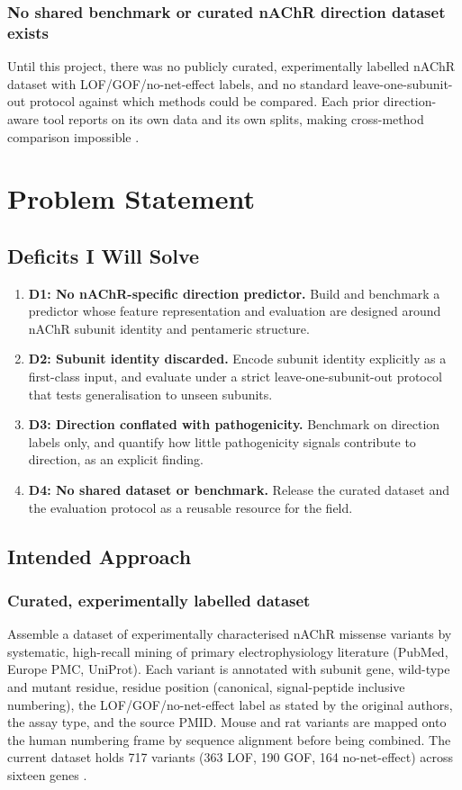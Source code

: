 \documentclass[rnd]{mas_proposal}
\begin{document}
\subsubsection{No shared benchmark or curated nAChR direction dataset exists}
Until this project, there was no publicly curated, experimentally labelled
nAChR dataset with LOF/GOF/no-net-effect labels, and no standard
leave-one-subunit-out protocol against which methods could be compared. Each
prior direction-aware tool reports on its own data and its own splits, making
cross-method comparison impossible \cite{mission,funncion}.

\section{Problem Statement}

\subsection{Deficits I Will Solve}
\begin{enumerate}
    \item \textbf{D1: No nAChR-specific direction predictor.} Build and
    benchmark a predictor whose feature representation and evaluation are
    designed around nAChR subunit identity and pentameric structure.
    \item \textbf{D2: Subunit identity discarded.} Encode subunit identity
    explicitly as a first-class input, and evaluate under a strict
    leave-one-subunit-out protocol that tests generalisation to unseen subunits.
    \item \textbf{D3: Direction conflated with pathogenicity.} Benchmark on
    direction labels only, and quantify how little pathogenicity signals
    contribute to direction, as an explicit finding.
    \item \textbf{D4: No shared dataset or benchmark.} Release the curated
    dataset and the evaluation protocol as a reusable resource for the field.
\end{enumerate}

\subsection{Intended Approach}

\subsubsection{Curated, experimentally labelled dataset}
Assemble a dataset of experimentally characterised nAChR missense variants by
systematic, high-recall mining of primary electrophysiology literature
(PubMed, Europe PMC, UniProt). Each variant is annotated with subunit gene,
wild-type and mutant residue, residue position (canonical, signal-peptide
inclusive numbering), the LOF/GOF/no-net-effect label as stated by the
original authors, the assay type, and the source PMID. Mouse and rat variants
are mapped onto the human numbering frame by sequence alignment before being
combined. The current dataset holds 717 variants (363 LOF, 190 GOF,
164 no-net-effect) across sixteen genes \cite{mohanraj2026}.
\end{document}
